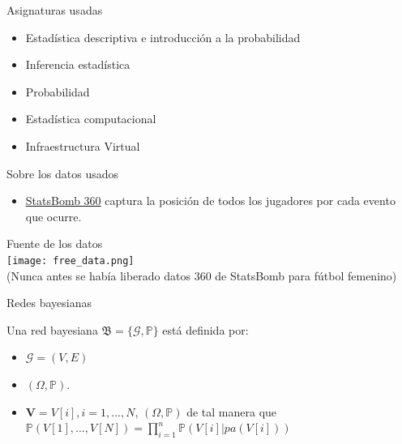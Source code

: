 \documentclass{beamer}
\begin{document}
\begin{frame}{Asignaturas usadas}
	\begin{itemize}
		\item Estadística descriptiva e introducción a la probabilidad 
		\item Inferencia estadística 
		\item Probabilidad 
		\item Estadística computacional 
		\item Infraestructura Virtual
	\end{itemize}
\end{frame}

\begin{frame}{Sobre los datos usados}
	\begin{itemize}
		\item \href{https://statsbomb.com/articles/soccer/statsbomb-release-free-360-data-womens-euro-2022-available-now/}{StatsBomb 360}
		captura la posición de todos los jugadores por cada evento que ocurre.
	\end{itemize}
	\begin{center}
		Fuente de los datos \\[12pt]
		\texttt{[image: free\_data.png]}
		\\
		\footnotesize(Nunca antes se había liberado datos 360 de StatsBomb para fútbol femenino)
    \end{center}
\end{frame}

\begin{frame}{Redes bayesianas}
    \begin{definition} 
        Una red bayesiana $\mathfrak{B} = \lbrace \mathcal{G}, \mathbb{P} \rbrace$ está definida por:
        \begin{itemize}
            \item $\mathcal{G}=(V,E)$ 
            \item $(\Omega, \mathbb{P})$.
            \item $\textbf{V}=V[i], i=1,...,N$, $(\Omega, \mathbb{P})$ 
            de tal manera que $\mathbb{P}(V[1],...,V[N])= \prod_{i=1}^{n}\mathbb{P}(V[i]|pa(V[i]))$
        \end{itemize}
    \end{definition}     
\end{frame}
\end{document}
